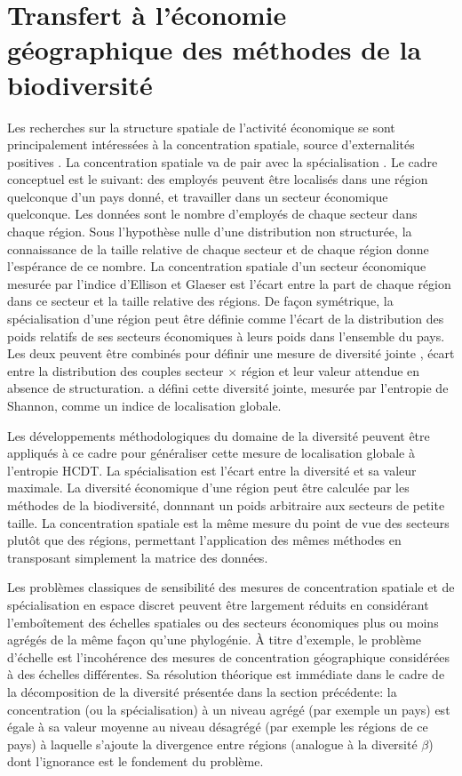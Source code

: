 \documentclass[a4paper]{article}
\begin{document}
\section{Transfert à l'économie géographique des méthodes de la biodiversité}

Les recherches sur la structure spatiale de l'activité économique se sont principalement intéressées à la concentration spatiale, source d'externalités positives \citep{Marshall1890, Weber1909, Krugman1991}.
La concentration spatiale va de pair avec la spécialisation \citep{Houdebine1999, Cutrini2010}.
Le cadre conceptuel est le suivant: des employés peuvent être localisés dans une région quelconque d'un pays donné, et travailler dans un secteur économique quelconque.
Les données sont le nombre d'employés de chaque secteur dans chaque région.
Sous l'hypothèse nulle d'une distribution non structurée, la connaissance de la taille relative de chaque secteur et de chaque région donne l'espérance de ce nombre.
La concentration spatiale d'un secteur économique mesurée par l'indice d'Ellison et Glaeser \citep{Ellison1997} est l'écart entre la part de chaque région dans ce secteur et la taille relative des régions.
De façon symétrique, la spécialisation d'une région peut être définie comme l'écart de la distribution des poids relatifs de ses secteurs économiques à leurs poids dans l'ensemble du pays.
Les deux peuvent être combinés pour définir une mesure de diversité jointe \citep{Gregorius2010}, écart entre la distribution des couples secteur $\times$ région et leur valeur attendue en absence de structuration.
\cite{Cutrini2010} a défini cette diversité jointe, mesurée par l'entropie de Shannon, comme un \og indice de localisation globale\fg{}.

Les développements méthodologiques du domaine de la diversité peuvent être appliqués à ce cadre pour généraliser cette mesure de localisation globale à l'entropie HCDT.
La spécialisation est l'écart entre la diversité et sa valeur maximale.
La diversité économique d'une région peut être calculée par les méthodes de la biodiversité, donnnant un poids arbitraire aux secteurs de petite taille.
La concentration spatiale est la même mesure du point de vue des secteurs plutôt que des régions, permettant l'application des mêmes méthodes en transposant simplement la matrice des données.

Les problèmes classiques de sensibilité des mesures de concentration spatiale et de spécialisation en espace discret \citep{Arbia1989, Openshaw1979} peuvent être largement réduits en considérant l'emboîtement des échelles spatiales ou des secteurs économiques plus ou moins agrégés de la même façon qu'une phylogénie.
\`A titre d'exemple, le problème d'échelle est l'incohérence des mesures de concentration géographique considérées à des échelles différentes.
Sa résolution théorique est immédiate dans le cadre de la décomposition de la diversité présentée dans la section précédente: la concentration (ou la spécialisation) à un niveau agrégé (par exemple un pays) est égale à sa valeur moyenne au niveau désagrégé (par exemple les régions de ce pays) à laquelle s'ajoute la divergence entre régions (analogue à la diversité $\beta$) dont l'ignorance est le fondement du problème.
\end{document}
